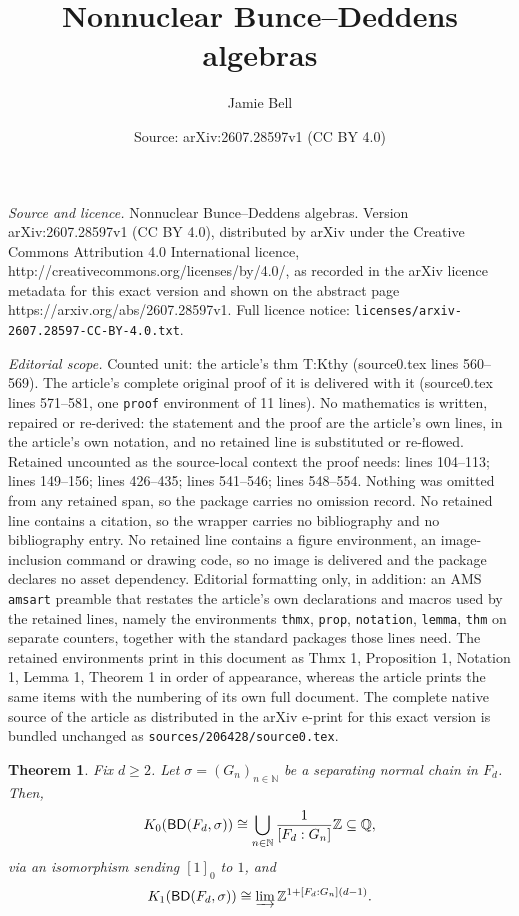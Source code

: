 \documentclass[10pt,a4paper]{amsart}
\title{Nonnuclear Bunce--Deddens algebras}
\author{Jamie Bell}
\date{Source: arXiv:2607.28597v1 (CC BY 4.0)}
\newtheorem{thmx}{Theorem}
\newcommand{\BD}{{\sf{BD}}}
\newcommand{\Nb}{\mathbb{N}}
\newcommand{\Qb}{\mathbb{Q}}
\newcommand{\Zb}{\mathbb{Z}}
\begin{document}
\maketitle

\noindent\emph{Source and licence.} Nonnuclear Bunce--Deddens algebras. Version arXiv:2607.28597v1 (CC BY 4.0), distributed by arXiv under the Creative Commons Attribution 4.0 International licence, http://creativecommons.org/licenses/by/4.0/, as recorded in the arXiv licence metadata for this exact version and shown on the abstract page https://arxiv.org/abs/2607.28597v1. Full licence notice: \texttt{licenses/arxiv-2607.28597-CC-BY-4.0.txt}.\par\smallskip

\noindent\textit{Editorial scope.} Counted unit: the article's thm T:Kthy (source0.tex lines 560--569). The article's complete original proof of it is delivered with it (source0.tex lines 571--581, one \texttt{proof} environment of 11 lines). No mathematics is written, repaired or re-derived: the statement and the proof are the article's own lines, in the article's own notation, and no retained line is substituted or re-flowed.  Retained uncounted as the source-local context the proof needs: lines 104--113; lines 149--156; lines 426--435; lines 541--546; lines 548--554.  Nothing was omitted from any retained span, so the package carries no omission record.  No retained line contains a citation, so the wrapper carries no bibliography and no bibliography entry.  No retained line contains a figure environment, an image-inclusion command or drawing code, so no image is delivered and the package declares no asset dependency.  Editorial formatting only, in addition: an AMS \texttt{amsart} preamble that restates the article's own declarations and macros used by the retained lines, namely the environments \texttt{thmx}, \texttt{prop}, \texttt{notation}, \texttt{lemma}, \texttt{thm} on separate counters, together with the standard packages those lines need.  The retained environments print in this document as Thmx 1, Proposition 1, Notation 1, Lemma 1, Theorem 1 in order of appearance, whereas the article prints the same items with the numbering of its own full document.  The complete native source of the article as distributed in the arXiv e-print for this exact version is bundled unchanged as \texttt{sources/206428/source0.tex}.
\begin{thmx}\label{T:B}
    Fix $d\ge 2$. Let $\sigma = (G_n)_{n\in\Nb}$ be a separating normal chain in $F_d$. Then, 
    \[
        K_0(\BD(F_d,\sigma)) \cong \bigcup_{n\in\Nb} \frac{1}{[F_d : G_n]}\Zb\subseteq \Qb,
    \]
    via an isomorphism sending $[1]_0$ to $1$, and 
    \[
        K_1(\BD(F_d,\sigma)) \cong \varinjlim \Zb^{1 + [F_d:G_n](d-1)}. 
    \]
\end{thmx}
\end{document}
